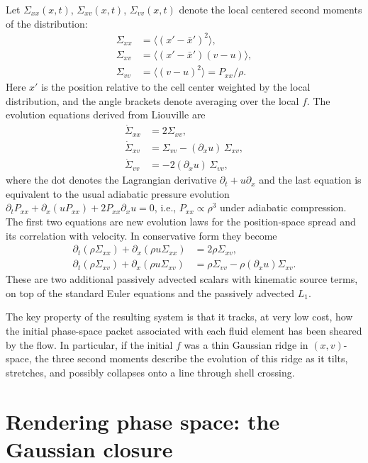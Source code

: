 \documentclass[11pt,letterpaper]{article}
\begin{document}
Let $\Sigma_{xx}(x, t)$, $\Sigma_{xv}(x, t)$, $\Sigma_{vv}(x, t)$ denote the local centered second moments of the distribution:
\begin{align}
\Sigma_{xx} &= \langle (x' - \bar x')^2 \rangle, \\
\Sigma_{xv} &= \langle (x' - \bar x')(v - u) \rangle, \\
\Sigma_{vv} &= \langle (v - u)^2 \rangle = P_{xx}/\rho.
\end{align}
Here $x'$ is the position relative to the cell center weighted by the local distribution, and the angle brackets denote averaging over the local $f$. The evolution equations derived from Liouville are
\begin{align}
\dot \Sigma_{xx} &= 2 \Sigma_{xv}, \label{eq:sxx_evol} \\
\dot \Sigma_{xv} &= \Sigma_{vv} - (\partial_x u)\, \Sigma_{xv}, \label{eq:sxv_evol} \\
\dot \Sigma_{vv} &= -2 (\partial_x u)\, \Sigma_{vv},
\end{align}
where the dot denotes the Lagrangian derivative $\partial_t + u \partial_x$ and the last equation is equivalent to the usual adiabatic pressure evolution $\partial_t P_{xx} + \partial_x(u P_{xx}) + 2 P_{xx} \partial_x u = 0$, i.e., $P_{xx} \propto \rho^3$ under adiabatic compression. The first two equations are new evolution laws for the position-space spread and its correlation with velocity. In conservative form they become
\begin{align}
\partial_t(\rho \Sigma_{xx}) + \partial_x(\rho u \Sigma_{xx}) &= 2\rho \Sigma_{xv}, \\
\partial_t(\rho \Sigma_{xv}) + \partial_x(\rho u \Sigma_{xv}) &= \rho \Sigma_{vv} - \rho (\partial_x u) \Sigma_{xv}.
\end{align}
These are two additional passively advected scalars with kinematic source terms, on top of the standard Euler equations and the passively advected $L_1$.

The key property of the resulting system is that it tracks, at very low cost, how the initial phase-space packet associated with each fluid element has been sheared by the flow. In particular, if the initial $f$ was a thin Gaussian ridge in $(x, v)$-space, the three second moments describe the evolution of this ridge as it tilts, stretches, and possibly collapses onto a line through shell crossing.

\section{Rendering phase space: the Gaussian closure}
\label{sec:gaussian}
\end{document}
